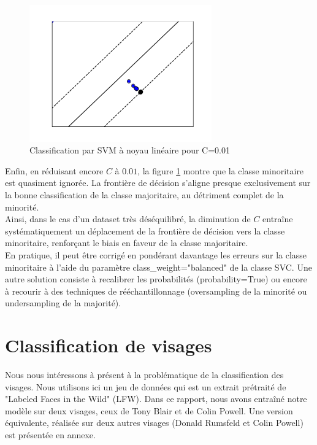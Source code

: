 \documentclass[a4paper,12pt]{article}
\begin{document}
\begin{figure}[H] 
    \centering
    \includegraphics[width=0.7\textwidth]{images/fitC001.pdf} 
    \caption{Classification par SVM à noyau linéaire pour C=0.01}
    \label{fig:fitC001}
\end{figure}

Enfin, en réduisant encore $C$ à $0.01$, la figure \ref{fig:fitC001} montre que la classe minoritaire est quasiment ignorée. La frontière de décision s’aligne presque exclusivement sur la bonne classification de la classe majoritaire, au détriment complet de la minorité.\\

Ainsi, dans le cas d’un dataset très déséquilibré, la diminution de $C$ entraîne systématiquement un déplacement de la frontière de décision vers la classe minoritaire, renforçant le biais en faveur de la classe majoritaire.\\

En pratique, il peut être corrigé en pondérant davantage les erreurs sur la classe minoritaire à l’aide du paramètre class\_weight="balanced" de la classe SVC. Une autre solution consiste à recalibrer les probabilités (probability=True) ou encore à recourir à des techniques de rééchantillonnage (oversampling de la minorité ou undersampling de la majorité).

\section{Classification de visages}

Nous nous intéressons à présent à la problématique de la classification des visages. Nous utilisons ici un jeu de données qui est un extrait prétraité de "Labeled Faces in the Wild" (LFW). Dans ce rapport, nous avons entraîné notre modèle sur deux visages, ceux de Tony Blair et de Colin Powell. Une version équivalente, réalisée sur deux autres visages (Donald Rumsfeld et Colin Powell) est présentée en annexe.
\end{document}
